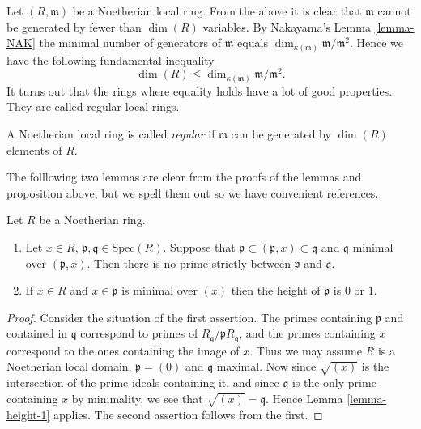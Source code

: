 \noindent
Let $(R, \mathfrak m)$ be a Noetherian local ring.
From the above it is clear that $\mathfrak m$ cannot be
generated by fewer than $\dim(R)$ variables.
By Nakayama's Lemma \ref{lemma-NAK} the minimal number
of generators of $\mathfrak m$ equals $\dim_{\kappa(\mathfrak m)}
\mathfrak m/\mathfrak m^2$. Hence we have the following
fundamental inequality
$$
\dim(R) \leq \dim_{\kappa(\mathfrak m)} \mathfrak m/\mathfrak m^2.
$$
It turns out that the rings where equality holds
have a lot of good properties. They are called
regular local rings.

\begin{definition}
\label{definition-regular-local}
A Noetherian local ring is called {\it regular}
if $\mathfrak m$ can be generated by $\dim(R)$
elements of $R$.
\end{definition}


\noindent
The folllowing two lemmas are clear from the proofs of the
lemmas and proposition above, but we spell them out so we have
convenient references.

\begin{lemma}
\label{lemma-minimal-over-1}
Let $R$ be a Noetherian ring.
\begin{enumerate}
\item Let $x\in R$, $\mathfrak p, \mathfrak q\in \text{Spec}(R)$.
Suppose that $\mathfrak p \subset (\mathfrak p, x) \subset
\mathfrak q$ and $\mathfrak q$ minimal over $(\mathfrak p, x)$.
Then there is no prime strictly between $\mathfrak p$ and $\mathfrak q$.
\item If $x\in R$ and $x \in \mathfrak p$ is minimal over $(x)$
then the height of $\mathfrak p$ is $0$ or $1$.
\end{enumerate}
\end{lemma}

\begin{proof}
Consider the situation of the first assertion.
The primes containing $\mathfrak p$ and contained
in $\mathfrak q$ correspond to primes of
$R_{\mathfrak q}/\mathfrak pR_{\mathfrak q}$, and
the primes containing $x$ correspond to the ones containing
the image of $x$. Thus we may assume $R$ is a Noetherian local domain,
$\mathfrak p = (0)$ and $\mathfrak q$ maximal. Now since
$\sqrt{(x)}$ is the intersection of the prime ideals
containing it, and since $\mathfrak q$ is the only prime
containing $x$ by minimality, we see that $\sqrt{(x)} = \mathfrak q$.
Hence Lemma \ref{lemma-height-1} applies.
The second assertion follows from the first.
\end{proof}

